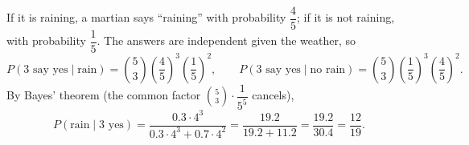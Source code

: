 If it is raining, a martian says ``raining'' with probability \(\dfrac{4}{5}\); if it is not raining, with probability \(\dfrac{1}{5}\). The answers are independent given the weather, so
\[
P(\text{3 say yes}\mid\text{rain})=\binom53\left(\dfrac{4}{5}\right)^3\left(\dfrac{1}{5}\right)^2,\qquad
P(\text{3 say yes}\mid\text{no rain})=\binom53\left(\dfrac{1}{5}\right)^3\left(\dfrac{4}{5}\right)^2 .
\]
By Bayes' theorem (the common factor \(\binom53\cdot\dfrac{1}{5^5}\) cancels),
\[
P(\text{rain}\mid\text{3 yes})=\dfrac{0.3\cdot 4^3}{0.3\cdot4^3+0.7\cdot 4^2}=\dfrac{19.2}{19.2+11.2}=\dfrac{19.2}{30.4}=\boxed{\dfrac{12}{19}}.
\]
